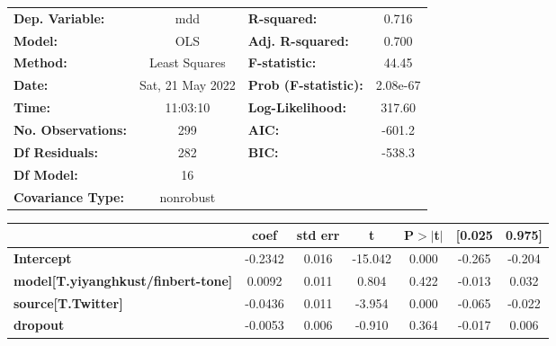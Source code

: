 \begin{center}
\begin{tabular}{lclc}
\toprule
\textbf{Dep. Variable:}                    &       mdd        & \textbf{  R-squared:         } &     0.716   \\
\textbf{Model:}                            &       OLS        & \textbf{  Adj. R-squared:    } &     0.700   \\
\textbf{Method:}                           &  Least Squares   & \textbf{  F-statistic:       } &     44.45   \\
\textbf{Date:}                             & Sat, 21 May 2022 & \textbf{  Prob (F-statistic):} &  2.08e-67   \\
\textbf{Time:}                             &     11:03:10     & \textbf{  Log-Likelihood:    } &    317.60   \\
\textbf{No. Observations:}                 &         299      & \textbf{  AIC:               } &    -601.2   \\
\textbf{Df Residuals:}                     &         282      & \textbf{  BIC:               } &    -538.3   \\
\textbf{Df Model:}                         &          16      & \textbf{                     } &             \\
\textbf{Covariance Type:}                  &    nonrobust     & \textbf{                     } &             \\
\bottomrule
\end{tabular}
\begin{tabular}{lcccccc}
                                           & \textbf{coef} & \textbf{std err} & \textbf{t} & \textbf{P$> |$t$|$} & \textbf{[0.025} & \textbf{0.975]}  \\
\midrule
\textbf{Intercept}                         &      -0.2342  &        0.016     &   -15.042  &         0.000        &       -0.265    &       -0.204     \\
\textbf{model[T.yiyanghkust/finbert-tone]} &       0.0092  &        0.011     &     0.804  &         0.422        &       -0.013    &        0.032     \\
\textbf{source[T.Twitter]}                 &      -0.0436  &        0.011     &    -3.954  &         0.000        &       -0.065    &       -0.022     \\
\textbf{dropout}                           &      -0.0053  &        0.006     &    -0.910  &         0.364        &       -0.017    &        0.006     \\

\end{tabular}
\end{center}
